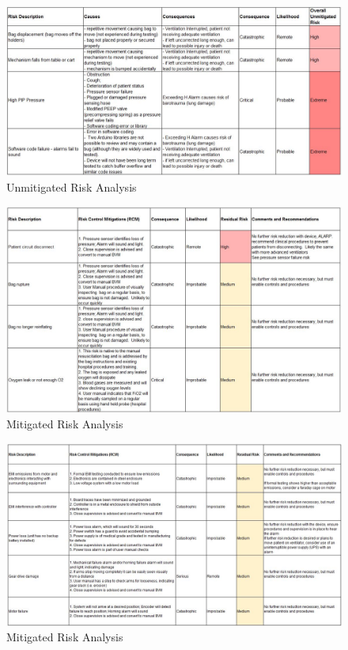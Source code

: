\documentclass[]{article}
\begin{document}
\begin{appendices}
\begin{figure}
	\includegraphics[scale= 0.7]{figures/unmit_3.jpg}
	\caption{Unmitigated Risk Analysis}
	\label{fig:unmit3}
\end{figure}



\begin{figure}
	\includegraphics[scale= 0.66]{figures/mit1.jpg}
	\caption{Mitigated Risk Analysis}
	\label{fig:mit1}
\end{figure}

\begin{figure}
	\includegraphics[scale= 0.7]{figures/mit2.jpg}
	\caption{Mitigated Risk Analysis}
	\label{fig:mit2}
\end{figure}


\end{appendices}
\end{document}
